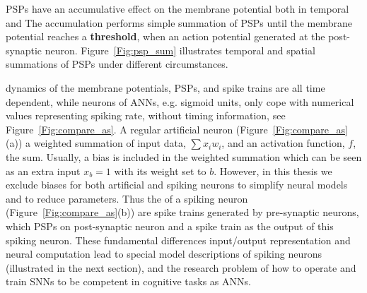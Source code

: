 \protect{}
\protect{} PSPs have an accumulative effect on the membrane potential both in temporal and \protect{} \protect{}
The accumulation performs \protect{} simple summation of PSPs until the membrane potential reaches a \textbf{threshold}, when an action potential \protect{} \protect{} generated at the post-synaptic neuron.
Figure~\ref{Fig:psp_sum} illustrates temporal and spatial summations of PSPs under different circumstances.

\protect{}
\protect{} dynamics of the membrane potentials, PSPs, and spike trains are all time dependent, while \protect{} neurons of ANNs, e.g. sigmoid units, only cope with numerical values representing spiking rate, without timing information, see Figure~\ref{Fig:compare_as}.
A regular artificial neuron (Figure~\ref{Fig:compare_as}(a)) \protect{} \protect{} a weighted summation of input data, $\sum x_i w_i$, and an activation function, $f$, \protect{} \protect{} the sum. Usually, a bias is included in the weighted summation which can be seen as an extra input $x_b = 1$ with its weight set to $b$.
However, in this thesis we exclude biases for both artificial and spiking neurons to simplify \protect{} neural models and to reduce \protect{} parameters.
Thus the \protect{} \protect{} of a spiking neuron (Figure~\ref{Fig:compare_as}(b)) are spike trains generated by pre-synaptic neurons, which \protect{} \protect{} PSPs on \protect{} \protect{} post-synaptic neuron and \protect{} \protect{} a spike train as the output of this spiking neuron.
These fundamental differences \protect{} \protect{} input/output representation and neural computation lead to special model descriptions of spiking neurons (illustrated in the next section), and \protect{} \protect{} the research problem of how to operate and train \protect{} \protect{} SNNs to be \protect{} competent in cognitive tasks \protect{} as \protect{} ANNs.

